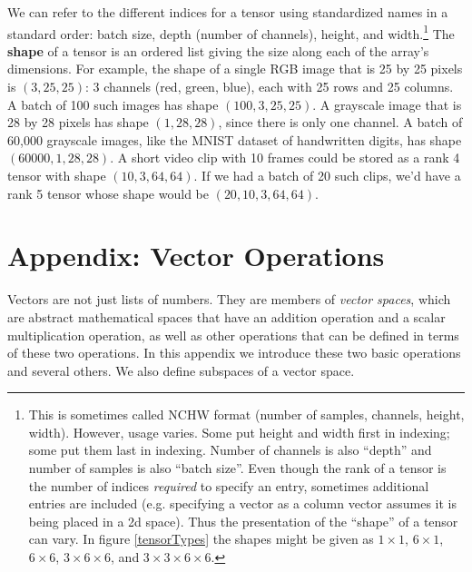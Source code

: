 We can refer to the different indices for a tensor using standardized names in a standard order: batch size, depth (number of channels), height, and width.\footnote{This is sometimes called NCHW format (number of samples, channels, height, width). However, usage varies. Some put height and width first in indexing; some put them last in indexing. Number of channels is also ``depth'' and number of samples is also ``batch size''. Even though the rank of a tensor is the number of indices \emph{required} to specify an entry, sometimes additional entries are included (e.g. specifying a vector as a column vector assumes it is being placed in a 2d space). Thus the presentation of the ``shape'' of a tensor can vary. In figure \ref{tensorTypes} the shapes might be given as $1 \times 1$, $6 \times 1$, $6 \times 6$, $3 \times 6 \times 6$, and $3 \times 3 \times 6 \times 6$.} The \textbf{shape} of a tensor is an ordered list giving the size along each of the array's dimensions. For example, the shape of a single RGB image that is 25 by 25 pixels is $(3, 25, 25)$: 3 channels (red, green, blue), each with 25 rows and 25 columns. A batch of 100 such images has shape $(100, 3, 25, 25)$. A grayscale image that is 28 by 28 pixels has shape $(1, 28, 28)$, since there is only one channel. A batch of 60,000 grayscale images, like the MNIST dataset of handwritten digits, has shape $(60000, 1, 28, 28)$. A short video clip with 10 frames could be stored as a rank 4 tensor with shape $(10, 3, 64, 64)$. If we had a batch of 20 such clips, we'd have a rank 5 tensor whose shape would be $(20, 10, 3, 64, 64)$.


\section{Appendix: Vector Operations}\label{S:LinearAlgebraAppendix}


   Vectors are not just lists of numbers. They are members of \emph{vector 
spaces}, which are abstract mathematical spaces that have an addition operation 
and a scalar multiplication operation, as well as other operations that can be 
defined in terms of these two operations. In this appendix we introduce these 
two basic operations and several others. We also define subspaces of a vector
space.
   
